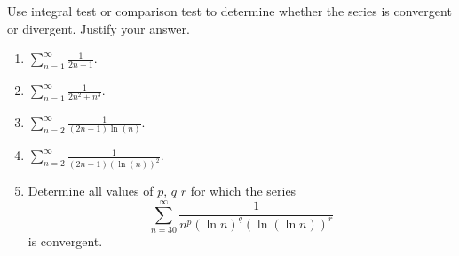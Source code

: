 Use integral test or comparison test to determine whether the series is convergent or divergent. Justify your answer.
\begin{multicols}{2}
\begin{enumerate}
\item 
$\displaystyle \sum\limits_{n=1}^{\infty} \frac{1}{2n+1}$.

\item 
$\displaystyle \sum\limits_{n=1}^{\infty} \frac{1}{2n^2+n^3}$.

\item 
$\displaystyle \sum\limits_{n=2}^{\infty} \frac{1}{(2n+1)\ln (n)}$.

\item 
$\displaystyle \sum\limits_{n=2}^{\infty} \frac{1}{(2n+1)(\ln (n))^2}$.

\item 
Determine all values of $p$, $q$ $r$ for which the series 
\[
\displaystyle \sum_{n=30}^{\infty} \frac{1}{n^p(\ln n)^q(\ln (\ln n))^r}
\]
is convergent.
\end{enumerate}
\end{multicols}

